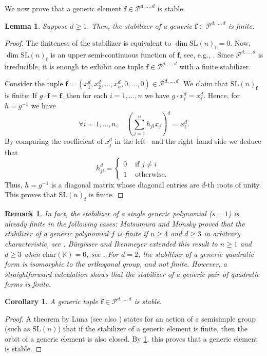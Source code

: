 \documentclass[11pt,a4paper]{article}
\newtheorem{corollary}[theorem]{Corollary}\AddToHook{env/corollary/begin}{\crefalias{theorem}{corollary}}
\newtheorem{lemma}[theorem]{Lemma}\AddToHook{env/lemma/begin}{\crefalias{theorem}{lemma}}
\newtheorem{remark}[theorem]{Remark}\AddToHook{env/remark/begin}{\crefalias{theorem}{remark}}
\numberwithin{equation}{section}
\newcommand{\KK}{\mathbb{K}}
\newcommand{\cP}{\mathcal{P}}
\newcommand{\ff}{\ensuremath{\boldsymbol{f}}}
\newcommand{\SL}{\mathrm{SL}}
\begin{document}
We now prove that a generic element $\ff\in\cP^{d,\dots,d}$ is stable.
\begin{lemma}
\label{lem:stabilizer}
    Suppose $d\geq 1$.
    Then, the stabilizer of a generic $\ff\in\cP^{d,\dots,d}$ is finite.
\end{lemma}
\begin{proof}
The finiteness of the stabilizer is equivalent to $\dim\SL(n)_{\ff}=0$.
Now, $\dim\SL(n)_{\ff}$ is an upper semi-continuous function of $\ff$, see, e.g., \cite[Proposition~2.27]{Hoskins-12}.
Since $\cP^{d,\dots,d}$ is irreducible, it is enough to exhibit one tuple $\ff\in\cP^{d,\dots,d}$ with a finite stabilizer.

Consider the tuple $\ff=(x_1^d, x_2^d,\dots,x_n^d,0,\dots,0)\in\cP^{d,\dots,d}$. 
We claim that $\SL(n)_{\ff}$ is finite:
If $g\cdot \ff=\ff$, then for each $i=1,\dots,n$ we have $g\cdot x_i^d=x_i^d$. 
Hence, for $h=g^{-1}$ we have \[
\forall i=1,\dots,n,\quad \left(\sum_{j=1}^n h_{ji} x_j\right)^d = x_i^d.
\] By comparing the coefficient of $x_j^{d}$ in the left-- and the right--hand side we deduce that \[
h_{ji}^d = \begin{cases}
    0 & \text{ if }j\neq i\\
    1 & \text{ otherwise. }
\end{cases}
\] Thus, $h=g^{-1}$ is a diagonal matrix whose diagonal entries are $d$-th roots of unity.
This proves that $\SL(n)_{\ff}$ is finite.
\end{proof}

\begin{remark}
In fact, the stabilizer of a single generic polynomial ($s=1$) is already finite in the following cases:
Matsumura and Monsky proved that the stabilizer of a generic polynomial $f$ is finite if $n\geq 4$ and $d\geq 3$ in arbitrary characteristic, see \cite[Theorem~5]{Matsumura-Monsky-63}.
B{\"u}rgisser and Ikenmeyer extended this result to $n\geq 1$ and $d\geq 3$ when $\mathrm{char}(\KK)=0$, see \cite[Theorem~2.3]{BI-17}.
For $d=2$, the stabilizer of a generic quadratic form is isomorphic to the orthogonal group, and not finite.
However, a straightforward calculation shows that the stabilizer of a generic pair of quadratic forms is finite.
\end{remark}

\begin{corollary}
    A generic tuple $\ff\in\cP^{d,\dots,d}$ is stable.
\end{corollary}
\begin{proof}
A theorem by Luna \cite{Luna-73} (see also \cite[\S II.4.3D, Folgerung, p.142]{Kraft-84}) states for an action of a semisimple group (such as $\SL(n)$) that if the stabilizer of a generic element is finite, then the orbit of a generic element is also closed.
By \cref{lem:stabilizer}, this proves that a generic element is stable.
\end{proof}
\end{document}
